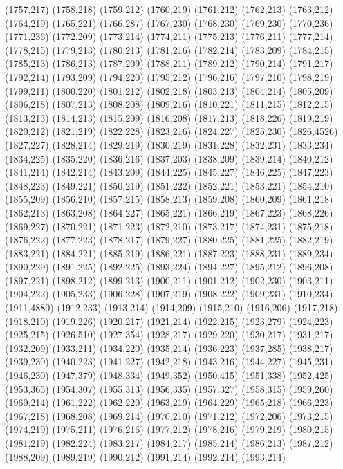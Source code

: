 (1757,217)
(1758,218)
(1759,212)
(1760,219)
(1761,212)
(1762,213)
(1763,212)
(1764,219)
(1765,221)
(1766,287)
(1767,230)
(1768,230)
(1769,230)
(1770,236)
(1771,236)
(1772,209)
(1773,214)
(1774,211)
(1775,213)
(1776,211)
(1777,214)
(1778,215)
(1779,213)
(1780,213)
(1781,216)
(1782,214)
(1783,209)
(1784,215)
(1785,213)
(1786,213)
(1787,209)
(1788,211)
(1789,212)
(1790,214)
(1791,217)
(1792,214)
(1793,209)
(1794,220)
(1795,212)
(1796,216)
(1797,210)
(1798,219)
(1799,211)
(1800,220)
(1801,212)
(1802,218)
(1803,213)
(1804,214)
(1805,209)
(1806,218)
(1807,213)
(1808,208)
(1809,216)
(1810,221)
(1811,215)
(1812,215)
(1813,213)
(1814,213)
(1815,209)
(1816,208)
(1817,213)
(1818,226)
(1819,219)
(1820,212)
(1821,219)
(1822,228)
(1823,216)
(1824,227)
(1825,230)
(1826,4526)
(1827,227)
(1828,214)
(1829,219)
(1830,219)
(1831,228)
(1832,231)
(1833,234)
(1834,225)
(1835,220)
(1836,216)
(1837,203)
(1838,209)
(1839,214)
(1840,212)
(1841,214)
(1842,214)
(1843,209)
(1844,225)
(1845,227)
(1846,225)
(1847,223)
(1848,223)
(1849,221)
(1850,219)
(1851,222)
(1852,221)
(1853,221)
(1854,210)
(1855,209)
(1856,210)
(1857,215)
(1858,213)
(1859,208)
(1860,209)
(1861,218)
(1862,213)
(1863,208)
(1864,227)
(1865,221)
(1866,219)
(1867,223)
(1868,226)
(1869,227)
(1870,221)
(1871,223)
(1872,210)
(1873,217)
(1874,231)
(1875,218)
(1876,222)
(1877,223)
(1878,217)
(1879,227)
(1880,225)
(1881,225)
(1882,219)
(1883,221)
(1884,221)
(1885,219)
(1886,221)
(1887,223)
(1888,231)
(1889,234)
(1890,229)
(1891,225)
(1892,225)
(1893,224)
(1894,227)
(1895,212)
(1896,208)
(1897,221)
(1898,212)
(1899,213)
(1900,211)
(1901,212)
(1902,230)
(1903,211)
(1904,222)
(1905,233)
(1906,228)
(1907,219)
(1908,222)
(1909,231)
(1910,234)
(1911,4880)
(1912,233)
(1913,214)
(1914,209)
(1915,210)
(1916,206)
(1917,218)
(1918,210)
(1919,226)
(1920,217)
(1921,214)
(1922,215)
(1923,279)
(1924,223)
(1925,215)
(1926,510)
(1927,354)
(1928,217)
(1929,220)
(1930,217)
(1931,217)
(1932,209)
(1933,211)
(1934,220)
(1935,214)
(1936,223)
(1937,285)
(1938,217)
(1939,230)
(1940,223)
(1941,227)
(1942,218)
(1943,216)
(1944,227)
(1945,231)
(1946,230)
(1947,379)
(1948,334)
(1949,352)
(1950,415)
(1951,338)
(1952,425)
(1953,365)
(1954,307)
(1955,313)
(1956,335)
(1957,327)
(1958,315)
(1959,260)
(1960,214)
(1961,222)
(1962,220)
(1963,219)
(1964,229)
(1965,218)
(1966,223)
(1967,218)
(1968,208)
(1969,214)
(1970,210)
(1971,212)
(1972,206)
(1973,215)
(1974,219)
(1975,211)
(1976,216)
(1977,212)
(1978,216)
(1979,219)
(1980,215)
(1981,219)
(1982,224)
(1983,217)
(1984,217)
(1985,214)
(1986,213)
(1987,212)
(1988,209)
(1989,219)
(1990,212)
(1991,214)
(1992,214)
(1993,214)

